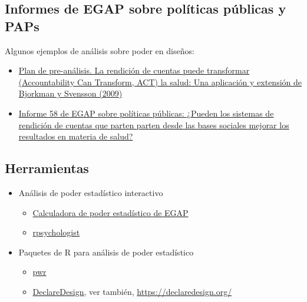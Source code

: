 \documentclass[
  12pt,
  spanish,
]{book}
\begin{document}
\hypertarget{informes-de-egap-sobre-poluxedticas-puxfablicas-y-paps}{%
\subsection{Informes de EGAP sobre políticas públicas y PAPs}\label{informes-de-egap-sobre-poluxedticas-puxfablicas-y-paps}}

Algunos ejemplos de análisis sobre poder en diseños:

\begin{itemize}
\item
  \href{https://osf.io/qxwmu/}{Plan de pre-análisis. La rendición de cuentas puede transformar (Accountability Can Transform, ACT) la salud: Una aplicación y extensión de Bjorkman y Svensson (2009)}
\item
  \href{https://egap.org/resource/does-bottom-up-accountability-work-evidence-from-uganda/}{Informe 58 de EGAP sobre políticas públicas: ¿Pueden los sistemas de rendición de cuentas que parten parten desde las bases sociales mejorar los resultados en materia de salud?}
\end{itemize}

\hypertarget{herramientas-3}{%
\subsection{Herramientas}\label{herramientas-3}}

\begin{itemize}
\item
  Análisis de poder estadístico interactivo

  \begin{itemize}
  \item
    \href{https://egap.shinyapps.io/power-app/}{Calculadora de poder estadístico de EGAP}
  \item
    \href{https://rpsychologist.com/d3/NHST/}{rpsychologist}
  \end{itemize}
\item
  Paquetes de R para análisis de poder estadístico

  \begin{itemize}
  \item
    \href{https://cran.r-project.org/web/packages/pwr/index.html}{pwr}
  \item
    \href{https://cran.r-project.org/web/packages/DeclareDesign/index.html}{DeclareDesign}, ver también, \url{https://declaredesign.org/}
  \end{itemize}
\end{itemize}
\end{document}
